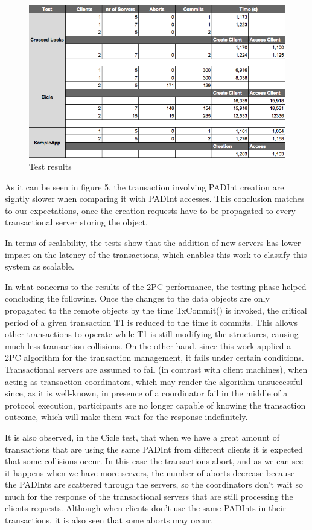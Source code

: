 \documentclass[times, 10pt,twocolumn]{article}
\begin{document}
\begin{figure}[h!]
	\centering
	\includegraphics[scale=0.4]{Tabela.png}
	\caption{Test results}
\end{figure}

As it can be seen in figure 5, the transaction involving PADInt creation are sightly slower when comparing it with PADInt accesses. This conclusion matches to our expectations,
once the creation requests have to be propagated to every transactional server storing the object.

In terms of scalability, the tests show that the addition of new servers has lower impact on the latency of the transactions, which enables this work to classify this system as scalable.

In what concerns to the results of the 2PC performance, the testing phase helped concluding the following. Once the changes to the data objects are only propagated to the remote objects by the time TxCommit() is invoked, the critical period of a given transaction T1 is reduced to the time it commits. This allows other transactions to operate while T1 is still modifying the structures, causing much less transaction collisions. On the other hand, since this work applied a 2PC algorithm for the transaction management, it fails under certain conditions. Transactional servers are assumed to fail (in contrast with client machines), when acting as transaction coordinators, which may render the algorithm unsuccessful since, as it is well-known, in presence of a coordinator fail in the middle of a protocol execution, participants are no longer capable of knowing the transaction outcome, which will make them wait for the response indefinitely. 

It is also observed, in the Cicle test, that when we have a great amount of transactions that are using the same PADInt from different clients it is expected that some collisions occur. In this case the transactions abort, and as we can see it happens when we have more servers, the number of aborts decrease because the PADInts are scattered through the servers, so the coordinators don't wait so much for the response of the transactional servers that are still processing the clients requests. Although when clients don't use the same PADInts in their transactions, it is also seen that some aborts may occur. 
\end{document}
